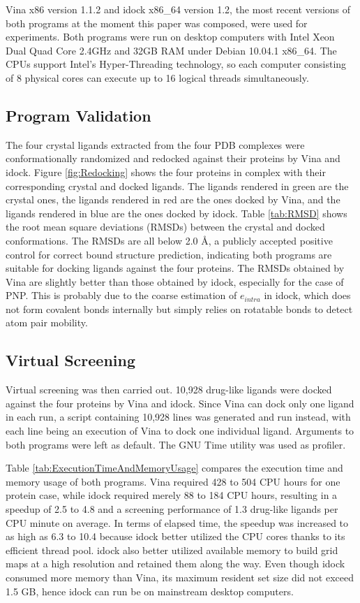 \documentclass[10pt, conference, compsocconf]{../IEEEtran}
\begin{document}
Vina x86 version 1.1.2 and idock x86\_64 version 1.2, the most recent versions of both programs at the moment this paper was composed, were used for experiments. Both programs were run on desktop computers with Intel Xeon Dual Quad Core 2.4GHz and 32GB RAM under Debian 10.04.1 x86\_64. The CPUs support Intel's Hyper-Threading technology, so each computer consisting of 8 physical cores can execute up to 16 logical threads simultaneously.

\subsection{Program Validation}

The four crystal ligands extracted from the four PDB complexes were conformationally randomized and redocked against their proteins by Vina and idock. Figure \ref{fig:Redocking} shows the four proteins in complex with their corresponding crystal and docked ligands. The ligands rendered in green are the crystal ones, the ligands rendered in red are the ones docked by Vina, and the ligands rendered in blue are the ones docked by idock. Table \ref{tab:RMSD} shows the root mean square deviations (RMSDs) between the crystal and docked conformations. The RMSDs are all below 2.0 \AA, a publicly accepted positive control for correct bound structure prediction, indicating both programs are suitable for docking ligands against the four proteins. The RMSDs obtained by Vina are slightly better than those obtained by idock, especially for the case of PNP. This is probably due to the coarse estimation of $e_{intra}$ in idock, which does not form covalent bonds internally but simply relies on rotatable bonds to detect atom pair mobility.


\subsection{Virtual Screening}

Virtual screening was then carried out. 10,928 drug-like ligands were docked against the four proteins by Vina and idock. Since Vina can dock only one ligand in each run, a script containing 10,928 lines was generated and run instead, with each line being an execution of Vina to dock one individual ligand. Arguments to both programs were left as default. The GNU Time utility was used as profiler.

Table \ref{tab:ExecutionTimeAndMemoryUsage} compares the execution time and memory usage of both programs. Vina required 428 to 504 CPU hours for one protein case, while idock required merely 88 to 184 CPU hours, resulting in a speedup of 2.5 to 4.8 and a screening performance of 1.3 drug-like ligands per CPU minute on average. In terms of elapsed time, the speedup was increased to as high as 6.3 to 10.4 because idock better utilized the CPU cores thanks to its efficient thread pool. idock also better utilized available memory to build grid maps at a high resolution and retained them along the way. Even though idock consumed more memory than Vina, its maximum resident set size did not exceed 1.5 GB, hence idock can run be on mainstream desktop computers.
\end{document}
